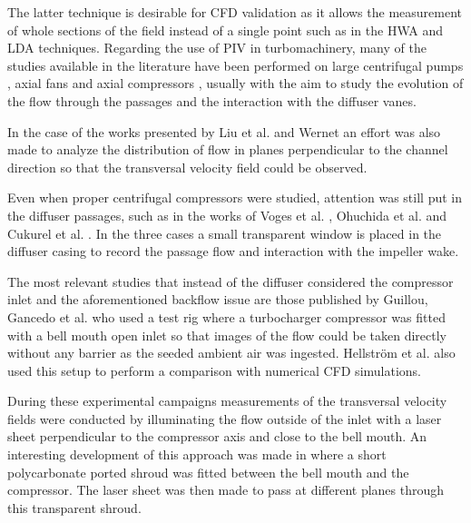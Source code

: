 The latter technique is desirable for CFD validation as it allows the measurement of whole sections of the field instead of a single point such as in the HWA and LDA techniques. Regarding the use of PIV in turbomachinery, many of the studies available in the literature have been performed on large centrifugal pumps \cite{pedersen2003flow,dazin2011high,wu2011piv}, axial fans \cite{fike2014visualisation,oro2009forced} and axial compressors \cite{liu2006application,wernet2000development,wernet2000application,wernet2001investigation}, usually with the aim to study the evolution of the flow through the passages and the interaction with the diffuser vanes. 

In the case of the works presented by Liu et al. \cite{liu2006application} and Wernet \cite{wernet2000development,wernet2000application} an effort was also made to analyze the distribution of flow in planes perpendicular to the channel direction so that the transversal velocity field could be observed.

Even when proper centrifugal compressors were studied, attention was still put in the diffuser passages, such as in the works of Voges et al. \cite{voges2007application}, Ohuchida et al. \cite{ohuchida2013internal} and Cukurel et al. \cite{cukurel2010particle}. In the three cases a small transparent window is placed in the diffuser casing to record the passage flow and interaction with the impeller wake.

The most relevant studies that instead of the diffuser considered the compressor inlet and the aforementioned backflow issue are those published by Guillou, Gancedo et al. \cite{guillou2010characterization,guillou2010surge,guillou2012piv,gancedo2016piv} who used a test rig where a turbocharger compressor was fitted with a bell mouth open inlet so that images of the flow could be taken directly without any barrier as the seeded ambient air was ingested. Hellström et al. \cite{hellstrom2010stall} also used this setup to perform a comparison with numerical CFD simulations.

During these experimental campaigns measurements of the transversal velocity fields were conducted by illuminating the flow outside of the inlet with a laser sheet perpendicular to the compressor axis and close to the bell mouth. An interesting development of this approach was made in \cite{gancedo2016piv} where a short polycarbonate ported shroud was fitted between the bell mouth and the compressor. The laser sheet was then made to pass at different planes through this transparent shroud.

